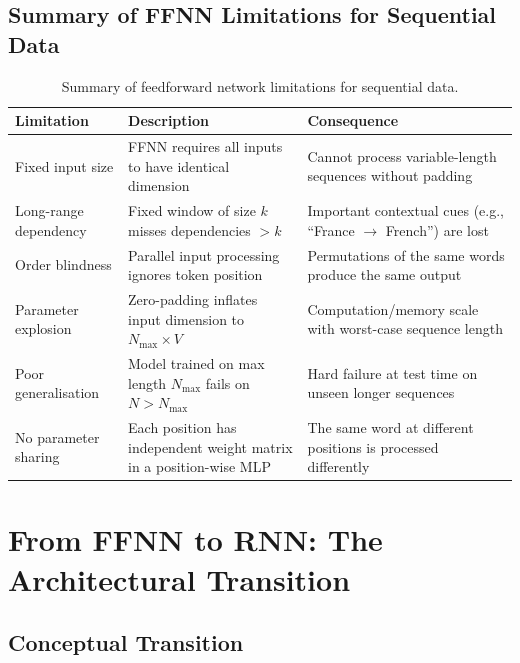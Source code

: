 \documentclass[12pt,a4paper]{article}
\begin{document}
\subsection{Summary of FFNN Limitations for Sequential Data}
\label{subsec:ffnn_summary}

\begin{table}[ht]
  \centering
  \caption{Summary of feedforward network limitations for sequential data.}
  \label{tab:ffnn_limits}
  \begin{tabularx}{\linewidth}{lXX}
    \toprule
    \textbf{Limitation} & \textbf{Description} & \textbf{Consequence} \\
    \midrule
    Fixed input size &
      FFNN requires all inputs to have identical dimension &
      Cannot process variable-length sequences without padding \\
    Long-range dependency &
      Fixed window of size $k$ misses dependencies $> k$ &
      Important contextual cues (e.g., ``France $\to$ French'') are lost \\
    Order blindness &
      Parallel input processing ignores token position &
      Permutations of the same words produce the same output \\
    Parameter explosion &
      Zero-padding inflates input dimension to $N_{\max} \times V$ &
      Computation/memory scale with worst-case sequence length \\
    Poor generalisation &
      Model trained on max length $N_{\max}$ fails on $N > N_{\max}$ &
      Hard failure at test time on unseen longer sequences \\
    No parameter sharing &
      Each position has independent weight matrix in a position-wise MLP &
      The same word at different positions is processed differently \\
    \bottomrule
  \end{tabularx}
\end{table}

\section{From FFNN to RNN: The Architectural Transition}
\label{sec:ffnn_to_rnn}

\subsection{Conceptual Transition}
\label{subsec:conceptual_transition}
\end{document}
